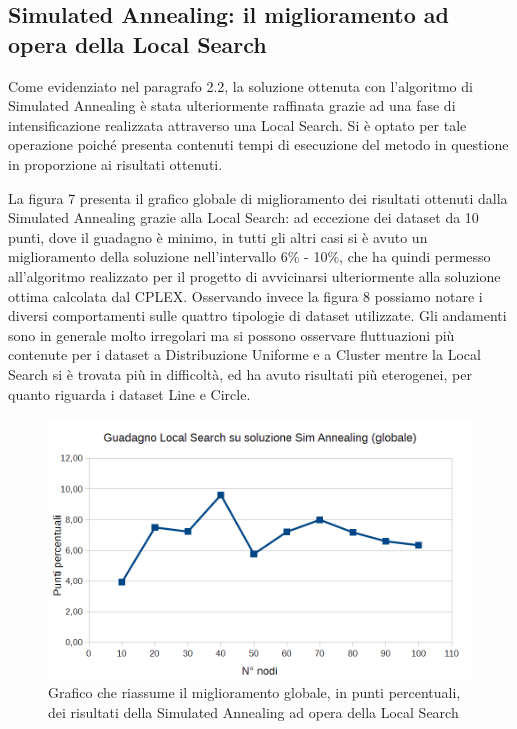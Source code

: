 \documentclass[preprint,12pt]{elsarticle}
\begin{document}
\subsection{\textbf{Simulated Annealing: il miglioramento ad opera della Local Search}}

Come evidenziato nel paragrafo 2.2, la soluzione ottenuta con l'algoritmo di Simulated Annealing è stata ulteriormente raffinata grazie ad una fase di intensificazione realizzata attraverso una Local Search. Si è optato per tale operazione poiché presenta contenuti tempi di esecuzione del metodo in questione in proporzione ai risultati ottenuti. 

La figura 7 presenta il grafico globale di miglioramento dei risultati ottenuti dalla Simulated Annealing grazie alla Local Search: ad eccezione dei dataset da 10 punti, dove il guadagno è minimo, in tutti gli altri casi si è avuto un miglioramento della soluzione nell'intervallo 6\% - 10\%, che ha quindi permesso all'algoritmo realizzato per il progetto di avvicinarsi ulteriormente alla soluzione ottima calcolata dal CPLEX. Osservando invece la figura 8 possiamo notare i diversi comportamenti sulle quattro tipologie di dataset utilizzate. Gli andamenti sono in generale molto irregolari ma si possono osservare fluttuazioni più contenute per i dataset a Distribuzione Uniforme e a Cluster mentre la Local Search si è trovata più in difficoltà, ed ha avuto risultati più eterogenei, per quanto riguarda i dataset Line e Circle.

\begin{figure}[htbp]
\centering
\includegraphics[scale=0.50]{grafici_confronti/guadagno_LS_globale.png} 
\caption{Grafico che riassume il miglioramento globale, in punti percentuali, dei risultati della Simulated Annealing ad opera della Local Search}\label{fig:7}
\end{figure}
\end{document}
